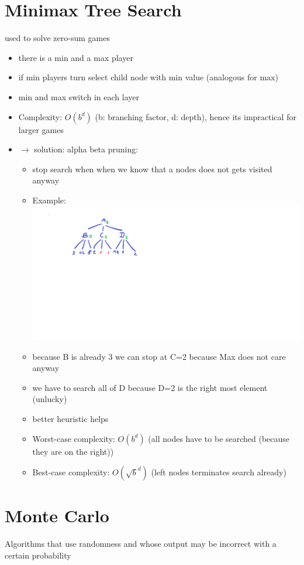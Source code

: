 \documentclass[12pt,a4paper]{article}
\begin{document}
\section{Minimax Tree Search}
used to solve zero-sum games
\begin{itemize}
\setlength\itemsep{0.05cm}
\item there is a min and a max player 
\item if min players turn select child node with min value (analogous for max)
\item min and max switch in each layer 
\item Complexity: $O(b^d)$ (b: branching factor, d: depth), hence its impractical for larger games
\item $\rightarrow$ solution: alpha beta pruning:
\begin{itemize}
\item stop search when when we know that a nodes does not gets visited anyway
\item Example: \\ \includegraphics[scale=0.4]{./resources/ab_search.png}
\item because B is already 3 we can stop at C=2 because Max does not care anyway
\item we have to search all of D because D=2 is the right most element (unlucky) 
\item better heuristic helps
\item Worst-case complexity: $O(b^d)$ (all nodes have to be searched (because they are on the right))
\item Best-case complexity: $O(\sqrt{b}^d)$ (left nodes terminates search already)
\end{itemize}
\end{itemize}

\section{Monte Carlo}
Algorithms that use randomness and whose output may be incorrect with a certain probability
\end{document}
